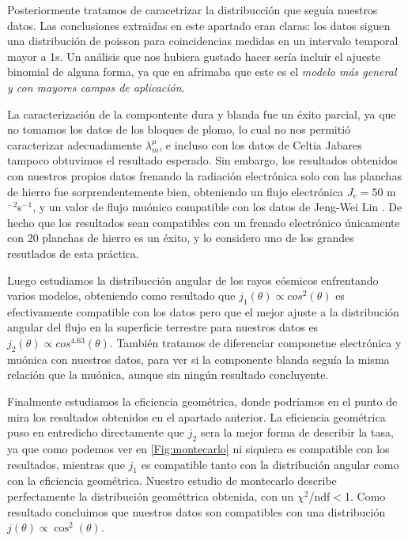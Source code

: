\documentclass[11pt]{article}
\begin{document}
Posteriormente tratamos de caracetrizar la distribucción que seguía nuestros datos. Las conclusiones extraidas en este apartado eran claras: los datos siguen una distribución de poisson para coincidencias medidas en un intervalo temporal mayor a 1s. Un análisis que nos hubiera gustado hacer sería incluir el ajueste binomial de alguna forma, ya que en \cite{Knoll:1300754} afrimaba que este es el \textit{modelo más general y con mayores campos de aplicación}. 

La caracterización de la compontente dura y blanda fue un éxito parcial, ya que no tomamos los datos de los bloques de plomo, lo cual no nos permitió caracterizar adecuadamente $\lambda_m^\mu$, e incluso con los datos de Celtia Jabares tampoco obtuvimos el resultado esperado. Sin embargo, los resultados obtenidos con nuestros propios datos frenando la radiación electrónica solo con las planchas de hierro fue sorprendentemente bien, obteniendo un flujo electrónica $J_e=50$ m$^{-2}$s$^{-1}$, y un valor de flujo muónico compatible con los datos  de Jeng-Wei Lin \cite{LIN201024}. De hecho que los resultados sean compatibles con un frenado electrónico únicamente con 20 planchas de hierro es un éxito, y lo considero uno de los grandes resutlados de esta práctica.

Luego estudiamos la distribucción angular de los rayos cósmicos enfrentando varios modelos, obteniendo como resultado que $j_1(\theta)\propto cos^2(\theta)$ es efectivamente compatible con los datos pero que el mejor ajuste a la distribución angular del flujo en la superficie terrestre para nuestros datos es $j_2(\theta)\propto cos^4.63(\theta)$. También tratamos de diferenciar componetne electrónica y muónica con nuestros datos, para ver si la componente blanda seguía la misma relación que la muónica, aunque sin ningún resultado concluyente.

Finalmente estudiamos la eficiencia geométrica, donde podríamos en el punto de mira los resultados obtenidos en el apartado anterior. La eficiencia geométrica puso en entredicho directamente que $j_2$ sera la mejor forma de describir la tasa, ya que como podemos ver en \cref{Fig:montecarlo} ni siquiera es compatible con los resultados, mientras que $j_1$ es compatible tanto con la distribución angular como con la eficiencia geométrica. Nuestro estudio de montecarlo describe perfectamente la distribución geométtrica obtenida, con un $\chi^2$/ndf$<$1. Como resultado concluimos que nuestros datos son compatibles con una distribución $j(\theta)\propto \cos^2(\theta)$. 
\end{document}
